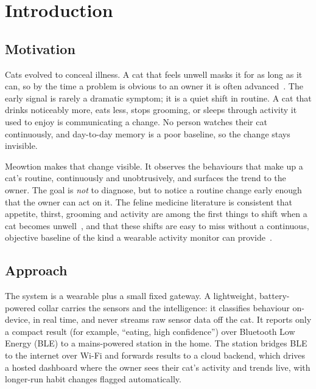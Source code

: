 \section{Introduction}
\label{sec:introduction}

\subsection{Motivation}

Cats evolved to conceal illness. A cat that feels unwell masks it for as long as it can, so by the
time a problem is obvious to an owner it is often advanced~\cite{stella2011sickness,robertson2018pain}.
The early signal is rarely a dramatic symptom; it is a quiet shift in routine. A cat that drinks
noticeably more, eats less, stops grooming, or sleeps through activity it used to enjoy is
communicating a change. No person watches their cat continuously, and day-to-day memory is a poor
baseline, so the change stays invisible.

Meowtion makes that change visible. It observes the behaviours that make up a cat's routine,
continuously and unobtrusively, and surfaces the trend to the owner. The goal is \emph{not} to
diagnose, but to notice a routine change early enough that the owner can act on it. The feline
medicine literature is consistent that appetite, thirst, grooming and activity are among the first
things to shift when a cat becomes unwell~\cite{stella2011sickness,bennett2012osteoarthritis}, and
that these shifts are easy to miss without a continuous, objective baseline of the kind a wearable
activity monitor can provide~\cite{yamazaki2020activity}.

\subsection{Approach}

The system is a wearable plus a small fixed gateway. A lightweight, battery-powered collar carries
the sensors and the intelligence: it classifies behaviour on-device, in real time, and never streams
raw sensor data off the cat. It reports only a compact result (for example, ``eating, high
confidence'') over Bluetooth Low Energy (BLE) to a mains-powered station in the home. The station
bridges BLE to the internet over Wi-Fi and forwards results to a cloud backend, which drives a hosted
dashboard where the owner sees their cat's activity and trends live, with longer-run habit changes
flagged automatically.

